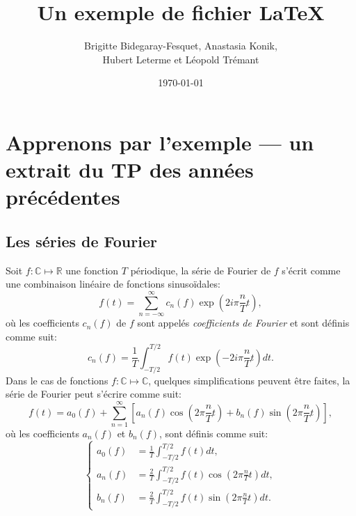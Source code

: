 \documentclass[12pt]{article}
\title{Un exemple de fichier LaTeX}
\author{Brigitte Bidegaray-Fesquet, Anastasia Konik, \\
Hubert Leterme et Léopold Trémant}
\date{\today} %
\def\bbR{{\mathbb{C}}} %
\def\bbC{{\mathbb{R}}} %
\begin{document}
\maketitle %

\section{Apprenons par l'exemple --- un extrait du TP des années précédentes} 

\subsection{Les séries de Fourier}
Soit $f:\bbR\mapsto\bbC$ une fonction $T$ périodique, la série de Fourier de $f$ s'écrit comme une combinaison linéaire de fonctions sinusoïdales:
\begin{equation}
	f(t) = \sum_{n=-\infty}^\infty c_n(f) \exp\left(2i\pi\frac{n}{T}t\right),
\end{equation}
où les coefficients $c_n(f)$ de $f$ sont appelés \textit{coefficients de Fourier}
et sont définis comme suit:
\begin{equation}
	c_n(f) = \frac1T \int_{-T/2}^{T/2} f(t) \exp\left(-2i\pi\frac{n}{T}t\right) dt.
\end{equation}
Dans le cas de fonctions $f:\bbR\mapsto\bbR$, quelques simplifications
peuvent être faites, la série de Fourier peut s'écrire comme suit:
\begin{equation}
	f(t) = a_0(f) 
    + \sum_{n=1}^\infty \left[
      a_n(f) \cos\left(2\pi\frac{n}{T}t\right) 
    + b_n(f) \sin\left(2\pi\frac{n}{T}t\right)\right],
\end{equation}
où les coefficients $a_n(f)$ et $b_n(f)$, sont définis comme suit:
\begin{equation}
\label{eq:coeffs_a_et_b}
	\left\{
    \begin{aligned}
		a_0(f) & = \frac1T \int_{-T/2}^{T/2} f(t) dt, \\
		a_n(f) & = \frac2T \int_{-T/2}^{T/2} f(t) \cos\left(2\pi\frac{n}{T}t\right) dt, \\
		b_n(f) & = \frac2T \int_{-T/2}^{T/2} f(t) \sin\left(2\pi\frac{n}{T}t\right) dt.
	\end{aligned}
    \right.
\end{equation}
\end{document}

